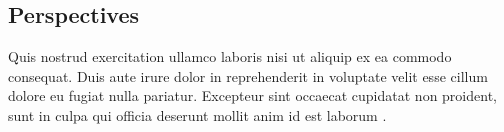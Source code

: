 \documentclass[a0, portrait]{a0poster}
\begin{document}
\begin{multicols}{3}
\section*{Perspectives}

Quis nostrud exercitation ullamco laboris nisi ut aliquip ex ea commodo
consequat. Duis aute irure dolor in reprehenderit in voluptate velit esse
cillum dolore eu fugiat nulla pariatur. Excepteur sint occaecat cupidatat non
proident, sunt in culpa qui officia deserunt mollit anim id est laborum \cite{ggmap,mapdata}.



\nocite{*} %


\end{multicols}
\end{document}
